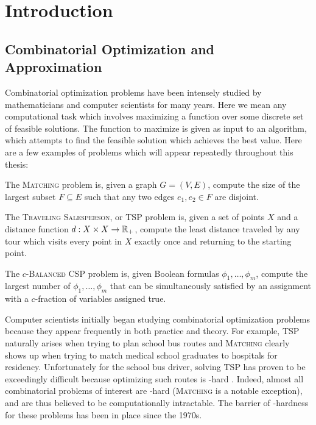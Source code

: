 \chapter{Introduction}\label{cha:introduction}

\section{Combinatorial Optimization and Approximation}
Combinatorial optimization problems have been intensely studied by mathematicians and computer scientists for many years.
Here we mean any computational task which involves maximizing a function over some discrete set of feasible solutions.
The function to maximize is given as input to an algorithm, which attempts to find the feasible solution which achieves the best value. 
Here are a few examples of problems which will appear repeatedly throughout this thesis: 
\begin{example}
The \textsc{Matching} problem is, given a graph $G = (V,E)$, compute the size of the largest subset $F \subseteq E$ such that any two edges $e_1,e_2 \in F$ are disjoint.
\end{example}
\begin{example}
The \textsc{Traveling Salesperson}, or \textsc{TSP} problem is, given a set of points $X$ and a distance function $d: X \times X \rightarrow \mathbb R_+$, compute the least distance traveled by any tour which visits every point in $X$ exactly once and returning to the starting point.
\end{example}
\begin{example}
The \textsc{$c$-Balanced CSP} problem is, given Boolean formulas $\phi_1,\dots,\phi_m$, compute the largest number of $\phi_1,\dots,\phi_m$ that can be simultaneously satisfied by an assignment with a $c$-fraction of variables assigned true.
\end{example}

Computer scientists initially began studying combinatorial optimization problems because they appear frequently in both practice and theory.
For example, \textsc{TSP} naturally arises when trying to plan school bus routes and \textsc{Matching} clearly shows up when trying to match medical school graduates to hospitals for residency. Unfortunately for the school bus driver, solving \textsc{TSP} has proven to be exceedingly difficult because optimizing such routes is \np-hard \cite{Karp1972}. Indeed, almost all combinatorial problems of interest are \np-hard (\textsc{Matching} is a notable exception), and are thus believed to be computationally intractable. The barrier of \np-hardness for these problems has been in place since the 1970s.

